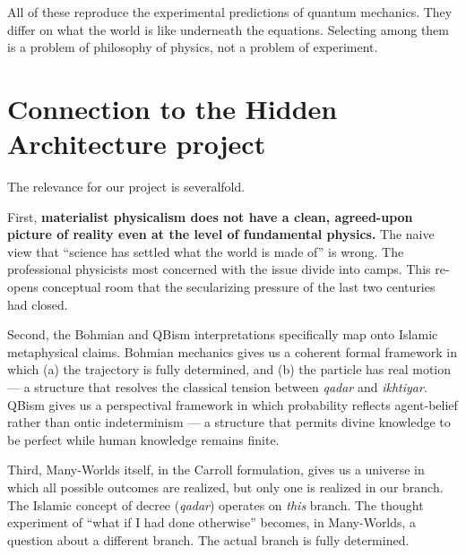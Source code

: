 \documentclass[11pt,a4paper]{book}
\theoremstyle{cleanrm}
\begin{document}
All of these reproduce the experimental predictions of quantum
mechanics. They differ on what the world is like underneath the
equations. Selecting among them is a problem of philosophy of
physics, not a problem of experiment.

\section{Connection to the Hidden Architecture project}

The relevance for our project is severalfold.

First, \textbf{materialist physicalism does not have a clean,
agreed-upon picture of reality even at the level of fundamental
physics.} The naive view that ``science has settled what the world is
made of'' is wrong. The professional physicists most concerned with
the issue divide into camps. This re-opens conceptual room that the
secularizing pressure of the last two centuries had closed.

Second, the Bohmian and QBism interpretations specifically map onto
Islamic metaphysical claims. Bohmian mechanics gives us a coherent
formal framework in which (a) the trajectory is fully determined, and
(b) the particle has real motion --- a structure that resolves the
classical tension between \emph{qadar} and \emph{ikhtiyar}. QBism
gives us a perspectival framework in which probability reflects
agent-belief rather than ontic indeterminism --- a structure that
permits divine knowledge to be perfect while human knowledge remains
finite.

Third, Many-Worlds itself, in the Carroll formulation, gives us a
universe in which all possible outcomes are realized, but only one
is realized in our branch. The Islamic concept of decree (\emph{qadar})
operates on \emph{this} branch. The thought experiment of
``what if I had done otherwise'' becomes, in Many-Worlds, a question
about a different branch. The actual branch is fully determined.
\end{document}
